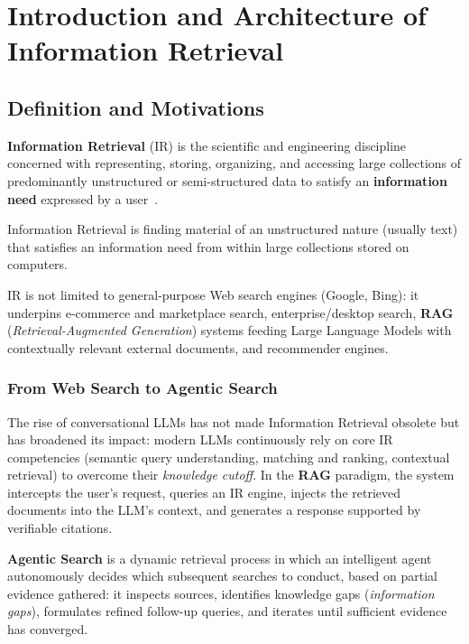 \chapter{Introduction and Architecture of Information Retrieval}

\FloatBarrier
\section{Definition and Motivations}

\textbf{Information Retrieval} (IR) is the scientific and engineering discipline concerned with representing, storing, organizing, and accessing large collections of predominantly unstructured or semi-structured data to satisfy an \textbf{information need} expressed by a user~\cite{manning2008,buttcher2010}.

\begin{definition}
Information Retrieval is finding material of an unstructured nature (usually text) that satisfies an information need from within large collections stored on computers.
\end{definition}

IR is not limited to general-purpose Web search engines (Google, Bing): it underpins e-commerce and marketplace search, enterprise/desktop search, \textbf{RAG} (\textit{Retrieval-Augmented Generation}) systems feeding Large Language Models with contextually relevant external documents, and recommender engines.

\subsection{From Web Search to Agentic Search}

The rise of conversational LLMs has not made Information Retrieval obsolete but has broadened its impact: modern LLMs continuously rely on core IR competencies (semantic query understanding, matching and ranking, contextual retrieval) to overcome their \textit{knowledge cutoff}. In the \textbf{RAG} paradigm, the system intercepts the user's request, queries an IR engine, injects the retrieved documents into the LLM's context, and generates a response supported by verifiable citations.

\begin{definition}
\textbf{Agentic Search} is a dynamic retrieval process in which an intelligent agent autonomously decides which subsequent searches to conduct, based on partial evidence gathered: it inspects sources, identifies knowledge gaps (\textit{information gaps}), formulates refined follow-up queries, and iterates until sufficient evidence has converged.
\end{definition}


